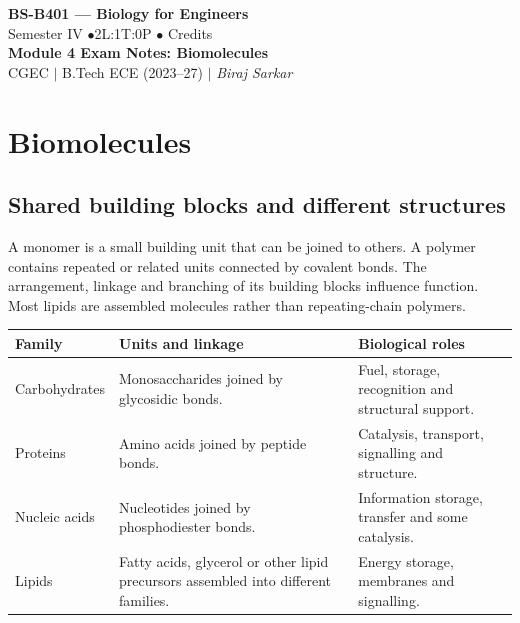 \documentclass[12pt,a4paper]{article}
\begin{document}
\begin{center}
  {\LARGE\bfseries\color{myred} BS-B401 --- Biology for Engineers}\\[5pt]
  {\normalsize\color{mydark} Semester IV \quad$\bullet$\quad 2L:1T:0P \quad$\bullet$ Credits}\\[3pt]
  {\normalsize\color{myteal}\textbf{Module 4 Exam Notes: Biomolecules}}\\[3pt]
  {\small\color{mydark} CGEC \;$|$\; B.Tech ECE (2023--27) \;$|$\; \textit{Biraj Sarkar}}
\end{center}
\vspace{2pt}
\noindent{\color{myred}\rule{\linewidth}{1.5pt}}
\vspace{2pt}

\hypersetup{linkcolor=mydark}
\tableofcontents
\hypersetup{linkcolor=myteal}
\newpage

\section{Biomolecules}
\subsection{Shared building blocks and different structures}
\begin{tcolorbox}[defbox, title={Monomer and polymer}]
A monomer is a small building unit that can be joined to others. A polymer contains repeated or related units connected by covalent bonds. The arrangement, linkage and branching of its building blocks influence function. Most lipids are assembled molecules rather than repeating-chain polymers.
\end{tcolorbox}

\par\vspace{5pt}
\begingroup
\setlength{\extrarowheight}{1pt}
\noindent\begin{tabularx}{\linewidth}{|B{3.1cm}|Y|Y|}
\hline
\textbf{Family} & \textbf{Units and linkage} & \textbf{Biological roles} \\ \hline
Carbohydrates & Monosaccharides joined by glycosidic bonds. & Fuel, storage, recognition and structural support. \\ \hline
Proteins & Amino acids joined by peptide bonds. & Catalysis, transport, signalling and structure. \\ \hline
Nucleic acids & Nucleotides joined by phosphodiester bonds. & Information storage, transfer and some catalysis. \\ \hline
Lipids & Fatty acids, glycerol or other lipid precursors assembled into different families. & Energy storage, membranes and signalling. \\ \hline
\end{tabularx}\par
\endgroup
\end{document}
